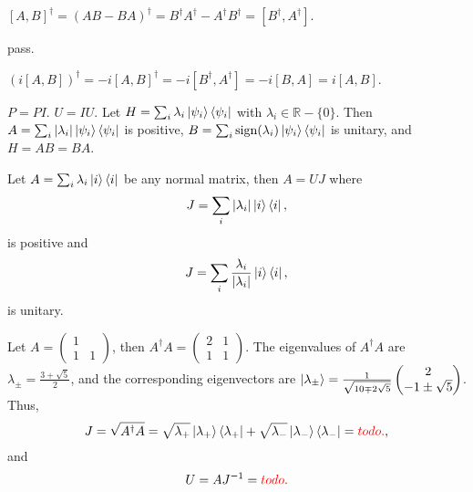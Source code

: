 \ex $[A,B]^\dagger=(AB-BA)^\dagger=B^\dagger A^\dagger-A^\dagger B^\dagger=[B^\dagger, A^\dagger]$.

\ex pass.

\ex $(i[A,B])^\dagger=-i[A,B]^\dagger=-i[B^\dagger,A^\dagger]=-i[B,A]=i[A,B]$.

\ex $P=PI$. $U=IU$. Let $H=\sum_i\lambda_i\left|\psi_i\right\rangle\left\langle\psi_i\right|$ with $\lambda_i\in\mathbb{R}-\{0\}$.
Then $A=\sum_i|\lambda_i|\left|\psi_i\right\rangle\left\langle\psi_i\right|$ is positive, $B=\sum_i\operatorname{sign}(\lambda_i)\left|\psi_i\right\rangle\left\langle\psi_i\right|$ is unitary, and $H=AB=BA$.

\ex Let $A = \sum_i\lambda_i\left|i\right\rangle\left\langle i\right|$ be any normal matrix, then $A=UJ$ where
$$J = \sum_i|\lambda_i|\left|i\right\rangle\left\langle i\right|,$$
is positive and
$$J = \sum_i\frac{\lambda_i}{|\lambda_i|}\left|i\right\rangle\left\langle i\right|,$$
is unitary.

\ex Let $A = \begin{pmatrix}
    1 & \\
    1 & 1
\end{pmatrix}$, then $A^\dagger A = \begin{pmatrix}
    2 & 1 \\
    1 & 1
\end{pmatrix}$.
The eigenvalues of $A^\dagger A$ are $\lambda_\pm = \frac{3+\sqrt{5}}{2}$, and the corresponding eigenvectors are $\left|\lambda_\pm\right\rangle = \frac{1}{\sqrt{10 \mp 2\sqrt{5}}}\begin{pmatrix}
    2 \\ -1 \pm \sqrt{5}
\end{pmatrix}$.
Thus,
$$J=\sqrt{A^\dagger A}=\sqrt{\lambda_+}\left|\lambda_+\right\rangle\left\langle\lambda_+\right|+\sqrt{\lambda_-}\left|\lambda_-\right\rangle\left\langle\lambda_-\right|={\color{red}{todo.}},$$
and
$$U=AJ^{-1}={\color{red}{todo.}}$$
